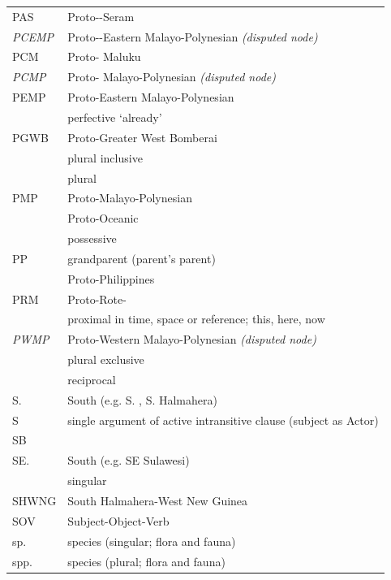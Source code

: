 {\begin{xltabular}{\textwidth}[l]{l>{\raggedright\arraybackslash}X}
PAS	&	Proto--Seram	\\
\it{PCEMP}	&	Proto--Eastern Malayo-Polynesian \it{(disputed node)}	\\
PCM	&	Proto- Maluku	\\
\it{PCMP}	&	Proto- Malayo-Polynesian \it{(disputed node)}	\\
PEMP	&	Proto-Eastern Malayo-Polynesian	\\
	&	perfective ‘already’	\\
PGWB	&	Proto-Greater West Bomberai \citep{UsherSchapper2022}	\\
	&	plural inclusive	\\
	&	plural 	\\
PMP	&	Proto-Malayo-Polynesian	\\
	&	Proto-Oceanic	\\
	&	possessive	\\
PP	&	grandparent (parent's parent)	\\
	&	Proto-Philippines	\\
PRM	&	Proto-Rote- \citep{Edwards2021}	\\
	&	proximal in time, space or reference; this, here, now	\\
\it{PWMP}	&	Proto-Western Malayo-Polynesian \it{(disputed node)}	\\
	&	plural exclusive	\\
	&	reciprocal	\\
S.	&	South (e.g. S. , S. Halmahera)	\\
S	&	single argument of active intransitive clause (subject as Actor)	\\
SB	&		\\
SE.	&	South (e.g. SE Sulawesi)	\\
	&	singular 	\\
SHWNG	&	South Halmahera-West New Guinea	\\
SOV	&	Subject-Object-Verb	\\
sp.	&	species (singular; flora and fauna)	\\
spp.	&	species (plural; flora and fauna)	\\

\end{xltabular}}
